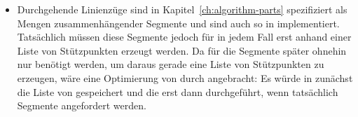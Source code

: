 \documentclass[../main/thesis.tex]{subfiles}
\begin{document}
\begin{itemize}
\item
Durchgehende Linienzüge sind in Kapitel~\ref{ch:algorithm-parts} spezifiziert als Mengen zusammenhängender Segmente und sind auch so in  implementiert.
Tatsächlich müssen diese Segmente jedoch für  in jedem Fall erst anhand einer Liste von Stützpunkten erzeugt werden.
Da für  die Segmente später ohnehin nur benötigt werden, um daraus gerade eine Liste von Stützpunkten zu erzeugen, wäre eine Optimierung von  durch  angebracht:
Es würde in  zunächst die Liste von  gespeichert und die  erst dann durchgeführt, wenn tatsächlich Segmente angefordert werden.

\end{itemize}



\onlyinsubfile{\listoffigures}
\onlyinsubfile{}
\end{document}
